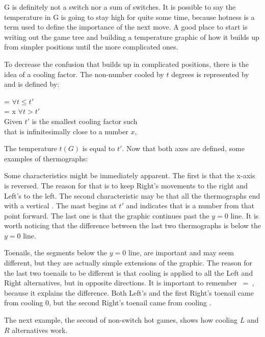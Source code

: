 G is definitely not a switch nor a sum of switches. It is possible to say the temperature in G is going to stay high for quite some time, because hotness is a term used to define the importance of the next move. A good place to start is writing out the game tree and building a temperature graphic of how it builds up from simpler positions until the more complicated ones.

To decrease the confusion that builds up in complicated positions, there is the idea of a cooling factor. The non-number \Gm{} cooled by $t$ degrees is represented by  and is defined by:
\begin{center}
	 =  $\forall t \leq t'$\\
	 = x $\forall t > t'$\\
	Given $t'$ is the smallest cooling factor such\\
	that  is infinitesimally close to a number $x$,
\end{center}

The temperature $t(G)$ is equal to $t'$. Now that both axes are defined, some examples of thermographs:



Some characteristics might be immediately apparent. The first is that the x-axis is reversed. The reason for that is to keep Right's movements to the right and Left's to the left. The second characteristic may be that all the thermographs end with a vertical . The mast begins at $t'$ and indicates that \Gm{} is a number from that point forward. The last one is that the graphic continues past the $y=0$ line. It is worth noticing that the difference between the last two thermographs is below the $y=0$ line.

Toenails, the segments below the $y=0$ line, are important and may seem different, but they are actually simple extensions of the graphic. The reason for the last two toenails to be different is that cooling is applied to all the Left and Right alternatives, but in opposite directions. It is important to remember \hbox{ = }, because it explains the difference. Both Left's and the first Right's toenail came from cooling 0, but the second Right's toenail came from cooling .

The next example, the second of non-switch hot games, shows how cooling $L$ and $R$ alternatives work.\\

